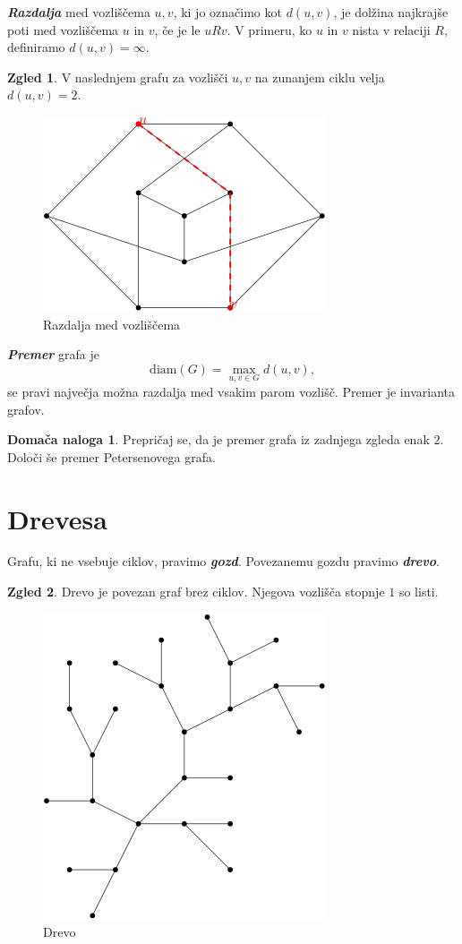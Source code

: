 \documentclass[11pt]{book}
\def\definicija{\color{rdeca}\bf\em}
\theoremstyle{definition}
\theoremstyle{zgled}
\newtheorem*{zgled}{Zgled}
\theoremstyle{odprtproblem}
\theoremstyle{domacanaloga}
\newtheorem*{domacanaloga}{Domača naloga}
\theoremstyle{izrek}
\begin{document}
{\definicija Razdalja} med vozliščema $u,v$, ki jo označimo kot $d(u,v)$, je dolžina najkrajše poti med vozliščema $u$ in $v$, če je le $u R v$. V primeru, ko $u$ in $v$ nista v relaciji $R$, definiramo $d(u,v) = \infty$.

\begin{zgled}
    V naslednjem grafu za vozlišči $u,v$ na zunanjem ciklu velja $d(u,v)=2$.
    \begin{figure}[h]
        \centering
        \includegraphics[width=0.5\linewidth]{img/grafi-razdalja.png}
        \caption{Razdalja med vozliščema}
    \end{figure}
\end{zgled}

{\definicija Premer} grafa je
\[
    \mathrm{diam}(G) = \max_{u,v \in G} d(u,v),
\]
se pravi največja možna razdalja med vsakim parom vozlišč. Premer je invarianta grafov.

\begin{domacanaloga}
    Prepričaj se, da je premer grafa iz zadnjega zgleda enak $2$. Določi še premer Petersenovega grafa.
\end{domacanaloga}

\section{Drevesa}

Grafu, ki ne vsebuje ciklov, pravimo {\definicija gozd}. Povezanemu gozdu pravimo {\definicija drevo}.

\begin{zgled}
Drevo je povezan graf brez ciklov. Njegova vozlišča stopnje $1$ so listi.
\begin{figure}[h]
    \centering
    \includegraphics[width=0.5\linewidth]{img/grafi-drevo.png}
    \caption{Drevo}
\end{figure}    
\end{zgled}
\end{document}

